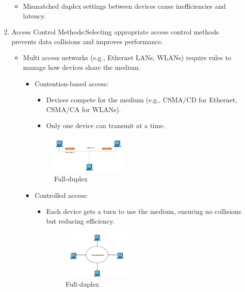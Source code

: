 \documentclass[a4paper,11pt]{article}
\begin{document}
\begin{enumerate}
\begin{itemize}
        \item Mismatched duplex settings between devices cause inefficiencies and latency.\\
    \end{itemize}
    \item Access Control Methods:Selecting appropriate access control methods prevents data collisions and improves performance.\\
    \begin{itemize}
        \item Multi access networks (e.g., Ethernet LANs, WLANs) require rules to manage how devices share the medium.\\
        \begin{itemize}
            \item Contention-based access:\\
            \begin{itemize}
                \item Devices compete for the medium (e.g., CSMA/CD for Ethernet, CSMA/CA for WLANs).\\
                \item Only one device can transmit at a time.\\
            \end{itemize}

    \begin{figure}[h!]
    \centering
    \includegraphics[width=0.4\textwidth]{31.png}
    \caption{Full-duplex}
    \label{fig:cap1}
    \end{figure}
            
            \item Controlled access:\\
            \begin{itemize}
                \item Each device gets a turn to use the medium, ensuring no collisions but reducing efficiency.\\
    \begin{figure}[h!]
    \centering
    \includegraphics[width=0.4\textwidth]{32.png}
    \caption{Full-duplex}
    \label{fig:cap1}
    \end{figure}
                
            \end{itemize}
        \end{itemize}
    \end{itemize}
\end{enumerate}
\end{document}
